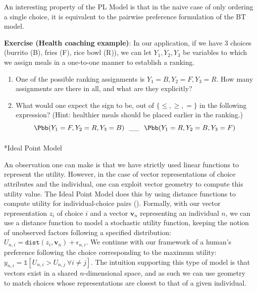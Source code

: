 \documentclass[
  letterpaper,
  DIV=11,
  numbers=noendperiod,
  oneside]{scrreprt}
\makeatletter
\let\oldparagraph\paragraph
\renewcommand{\paragraph}{
    \@ifstar
      \xxxParagraphStar
      \xxxParagraphNoStar
  }
\newcommand{\xxxParagraphStar}[1]{\oldparagraph*{#1}\mbox{}}
\newcommand{\xxxParagraphNoStar}[1]{\oldparagraph{#1}\mbox{}}
\theoremstyle{remark}
\makeatother
\begin{document}
An interesting property of the PL Model is that in the naive case of
only ordering a single choice, it is equivalent to the pairwise
preference formulation of the BT model.

\textbf{Exercise (Health coaching example)}: In our application, if we
have \(3\) choices (burrito (B), fries (F), rice bowl (R)), we can let
\(Y_1, Y_2, Y_3\) be variables to which we assign meals in a one-to-one
manner to establish a ranking.

\begin{enumerate}
\def\labelenumi{\arabic{enumi}.}
\item
  One of the possible ranking assignments is \(Y_1=B, Y_2=F, Y_3=R\).
  How many assignments are there in all, and what are they explicitly?
\item
  What would one expect the sign to be, out of \(\{\leq, \geq, =\}\) in
  the following expression? (Hint: healthier meals should be placed
  earlier in the ranking.)
  \[\Pbb(Y_1=F, Y_2=R, Y_3=B) \ \ \_\_\ \ \Pbb(Y_1=R, Y_2=B, Y_3=F)\]
\end{enumerate}

\paragraph*{Ideal Point Model}\label{ideal-point-model}

An observation one can make is that we have strictly used linear
functions to represent the utility. However, in the case of vector
representations of choice attributes and the individual, one can exploit
vector geometry to compute this utility value. The Ideal Point Model
does this by using distance functions to compute utility for
individual-choice pairs ().
Formally, with our vector representation \(z_i\) of choice \(i\) and a
vector \(\textbf{v}_n\) representing an individual \(n\), we can use a
distance function to model a stochastic utility function, keeping the
notion of unobserved factors following a specified distribution:
\(U_{n, i} = \texttt{dist}(z_i, \textbf{v}_n) + \epsilon_{n, i}\). We
continue with our framework of a human's preference following the choice
corresponding to the maximum utility:
\(y_{n, i} = \mathds{1}[U_{n, i} > U_{n, j}\ \forall i \ne j]\). The
intuition supporting this type of model is that vectors exist in a
shared \(n\)-dimensional space, and as such we can use geometry to match
choices whose representations are closest to that of a given individual.
\end{document}
